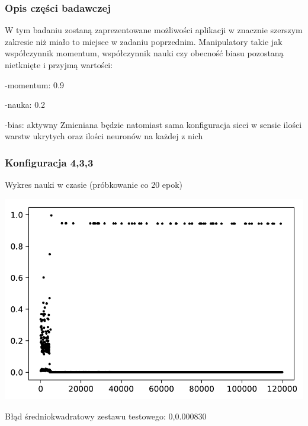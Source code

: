 \documentclass{classrep}
\begin{document}
\subsubsection{Opis części badawczej}
W tym badaniu zostaną zaprezentowane możliwości aplikacji w znacznie szerszym zakresie niż miało to miejsce w zadaniu poprzednim. Manipulatory takie jak współczynnik momentum, współczynnik nauki czy obecność biasu pozostaną nietknięte i przyjmą wartości:

-momentum: 0.9

-nauka: 0.2

-bias: aktywny
\newline
Zmieniana będzie natomiast sama konfiguracja sieci w sensie ilości warstw ukrytych oraz ilości neuronów na każdej z nich
\subsubsection{Konfiguracja 4,3,3}
Wykres nauki w czasie (próbkowanie co 20 epok)
\begin{center}
 \includegraphics{output_0_0.pdf}
\end{center}
Błąd średniokwadratowy zestawu testowego: 0,0.000830
\newpage
\end{document}
